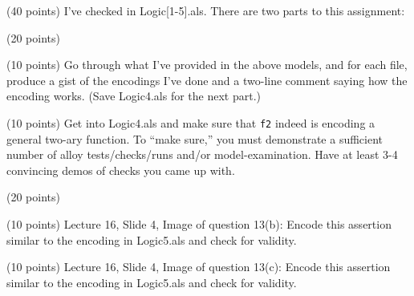 \documentclass[11pt]{article}
\begin{document}
\begin{compactenum}

\item (40 points)
  I've checked in Logic[1-5].als. There are two parts to this assignment:
  \begin{compactenum}
  \item (20 points)
    \begin{compactenum}
    \item (10 points)
    Go through what I've provided in the above models, and for each
    file, produce a gist of the encodings I've done and a  two-line
    comment saying how the encoding works. (Save Logic4.als for the
    next part.)

    \item (10 points)
    Get into Logic4.als and make sure that {\tt f2} indeed
    is encoding a general two-ary function. To ``make sure,'' you must
    demonstrate a sufficient number of alloy tests/checks/runs and/or
    model-examination. Have at least 3-4 convincing demos of checks
    you came up with.
      
    \end{compactenum}
    
  \item (20 points)
    \begin{compactenum}
    \item (10 points) Lecture 16, Slide 4, Image of question 13(b):
      Encode this assertion similar to the encoding in Logic5.als
      and check for validity.
      
    \item (10 points) Lecture 16, Slide 4, Image of question 13(c):
      Encode this assertion similar to the encoding in Logic5.als
      and check for validity.      
    \end{compactenum}
  \end{compactenum}

  
\begin{minipage}{\minpagw}
\end{minipage}
\end{compactenum}
\end{document}
